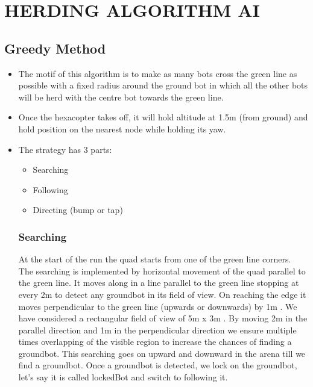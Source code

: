 \documentclass[12pt]{article}
\begin{document}
\section{HERDING ALGORITHM AI}
\subsection{Greedy Method}
\begin{itemize}
    \item The motif of this algorithm is to make as many bots cross the green line as possible with a fixed radius around the ground bot in which all the other bots will be herd with the centre bot towards the green line.
    \item Once the hexacopter takes off, it will hold altitude at 1.5m (from ground) and hold position on the nearest node while holding its yaw.
    \item The strategy has 3 parts:
    	\begin{itemize}
    		\item Searching
    		\item Following
    		\item Directing (bump or tap)
    	\end{itemize}
    \subsubsection{Searching}
    At the start of the run the quad starts from one of the green line corners. The searching is implemented by
horizontal movement of the quad parallel to the green line. It moves along in a line parallel to the green
line stopping at every 2m to detect any groundbot in its field of view. On reaching the edge it moves
perpendicular to the green line (upwards or downwards) by 1m .
We have considered a rectangular field of view of 5m x 3m . By moving 2m in the parallel direction and 1m
in the perpendicular direction we ensure multiple times overlapping of the visible region to increase the
chances of finding a groundbot.
This searching goes on upward and downward in the arena till we find a groundbot.
Once a groundbot is detected, we lock on the groundbot, let’s say it is called lockedBot and switch to following it.

\end{itemize}
\end{document}
